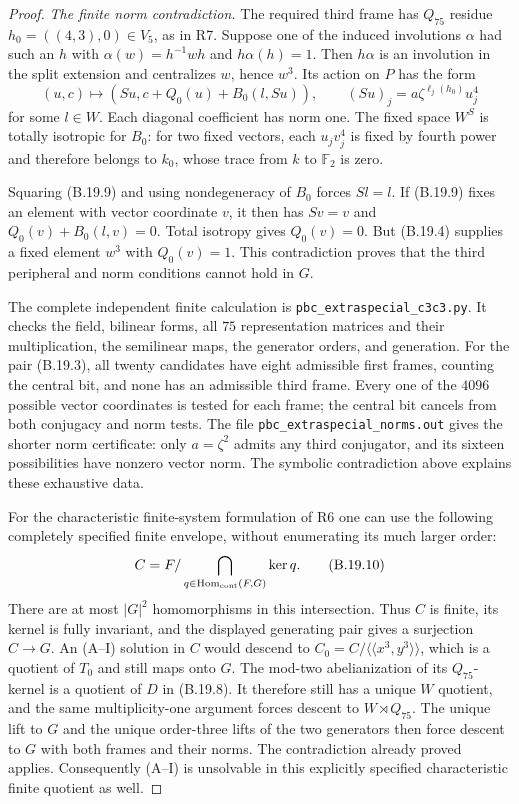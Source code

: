 \begin{proof}
\emph{The finite norm contradiction.}
The required third frame has $Q_{75}$ residue
$h_0=((4,3),0)\in V_5$, as in R7. Suppose one of the induced
involutions $\alpha$ had such an $h$ with
$\alpha(w)=h^{-1}wh$ and $h\alpha(h)=1$.
Then $h\alpha$ is an involution in the split extension and
centralizes $w$, hence $w^3$. Its action on $P$ has the form
\[
        (u,c)\longmapsto
          (Su,c+Q_0(u)+B_0(l,Su)),
 \qquad
        (Su)_j=a\zeta^{\ell_j(h_0)}u_j^4
 \tag{B.19.9}
\]
for some $l\in W$. Each diagonal coefficient has norm one.
The fixed space $W^S$ is totally isotropic for $B_0$:
for two fixed vectors, each $u_jv_j^4$ is fixed by fourth
power and therefore belongs to $k_0$, whose trace from $k$
to $\mathbb F_2$ is zero.

Squaring (B.19.9) and using nondegeneracy of $B_0$ forces
$Sl=l$. If (B.19.9) fixes an element with vector coordinate
$v$, it then has $Sv=v$ and
$Q_0(v)+B_0(l,v)=0$. Total isotropy gives $Q_0(v)=0$.
But (B.19.4) supplies a fixed element $w^3$ with $Q_0(v)=1$.
This contradiction proves that the third peripheral and norm
conditions cannot hold in $G$.

The complete independent finite calculation is
\texttt{pbc\_extraspecial\_c3c3.py}. It checks the field,
bilinear forms, all $75$ representation matrices and their
multiplication, the semilinear maps, the generator orders,
and generation. For the pair (B.19.3), all twenty candidates
have eight admissible first frames, counting the central bit,
and none has an admissible third frame. Every one of the
$4096$ possible vector coordinates is tested for each frame;
the central bit cancels from both conjugacy and norm tests.
The file \texttt{pbc\_extraspecial\_norms.out} gives the shorter
norm certificate: only $a=\zeta^2$ admits any third conjugator,
and its sixteen possibilities have nonzero vector norm.
The symbolic contradiction above explains these exhaustive data.

For the characteristic finite-system formulation of R6 one can
use the following completely specified finite envelope, without
enumerating its much larger order:
\[
 C=F/\bigcap_{q\in\operatorname{Hom}_{\rm cont}(F,G)}\ker q.
 \tag{B.19.10}
\]
There are at most $|G|^2$ homomorphisms in this intersection.
Thus $C$ is finite, its kernel is fully invariant, and the
displayed generating pair gives a surjection $C\to G$.
An (A--I) solution in $C$ would descend to
$C_0=C/\langle\!\langle x^3,y^3\rangle\!\rangle$, which
is a quotient of $T_0$ and still maps onto $G$.
The mod-two abelianization of its $Q_{75}$-kernel is a quotient
of $D$ in (B.19.8). It therefore still has a unique $W$ quotient,
and the same multiplicity-one argument forces descent to
$W\rtimes Q_{75}$. The unique lift to $G$ and the unique
order-three lifts of the two generators then force descent to
$G$ with both frames and their norms. The contradiction already
proved applies. Consequently (A--I) is unsolvable in this
explicitly specified characteristic finite quotient as well.
\end{proof}

